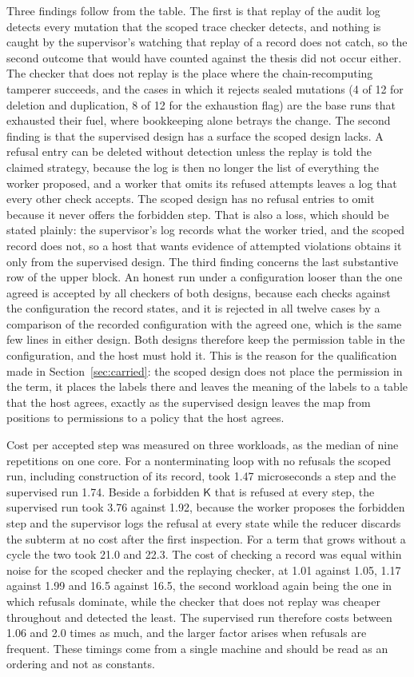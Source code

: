 \documentclass[11pt]{article}
\theoremstyle{definition}
\theoremstyle{remark}
\newcommand{\cK}{\mathsf{K}}
\begin{document}
Three findings follow from the table. The first is that replay of the audit log detects every mutation that the scoped trace checker detects, and nothing is caught by the supervisor's watching that replay of a record does not catch, so the second outcome that would have counted against the thesis did not occur either. The checker that does not replay is the place where the chain-recomputing tamperer succeeds, and the cases in which it rejects sealed mutations (4 of 12 for deletion and duplication, 8 of 12 for the exhaustion flag) are the base runs that exhausted their fuel, where bookkeeping alone betrays the change. The second finding is that the supervised design has a surface the scoped design lacks. A refusal entry can be deleted without detection unless the replay is told the claimed strategy, because the log is then no longer the list of everything the worker proposed, and a worker that omits its refused attempts leaves a log that every other check accepts. The scoped design has no refusal entries to omit because it never offers the forbidden step. That is also a loss, which should be stated plainly: the supervisor's log records what the worker tried, and the scoped record does not, so a host that wants evidence of attempted violations obtains it only from the supervised design. The third finding concerns the last substantive row of the upper block. An honest run under a configuration looser than the one agreed is accepted by all checkers of both designs, because each checks against the configuration the record states, and it is rejected in all twelve cases by a comparison of the recorded configuration with the agreed one, which is the same few lines in either design. Both designs therefore keep the permission table in the configuration, and the host must hold it. This is the reason for the qualification made in Section~\ref{sec:carried}: the scoped design does not place the permission in the term, it places the labels there and leaves the meaning of the labels to a table that the host agrees, exactly as the supervised design leaves the map from positions to permissions to a policy that the host agrees.

Cost per accepted step was measured on three workloads, as the median of nine repetitions on one core. For a nonterminating loop with no refusals the scoped run, including construction of its record, took 1.47 microseconds a step and the supervised run 1.74. Beside a forbidden $\cK$ that is refused at every step, the supervised run took 3.76 against 1.92, because the worker proposes the forbidden step and the supervisor logs the refusal at every state while the reducer discards the subterm at no cost after the first inspection. For a term that grows without a cycle the two took 21.0 and 22.3. The cost of checking a record was equal within noise for the scoped checker and the replaying checker, at 1.01 against 1.05, 1.17 against 1.99 and 16.5 against 16.5, the second workload again being the one in which refusals dominate, while the checker that does not replay was cheaper throughout and detected the least. The supervised run therefore costs between 1.06 and 2.0 times as much, and the larger factor arises when refusals are frequent. These timings come from a single machine and should be read as an ordering and not as constants.
\end{document}
